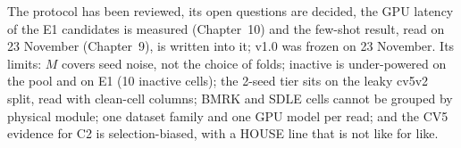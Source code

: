 The protocol has been reviewed, its open questions are decided, the GPU latency of the E1 candidates is measured (Chapter~10) and
the few-shot result, read on 23 November (Chapter~9), is written into it; v1.0 was frozen on 23 November. Its limits: $M$ covers seed noise, not the choice of folds;
inactive is under-powered on the pool and on E1 (10 inactive cells); the 2-seed tier sits on the leaky cv5v2 split, read with
clean-cell columns; BMRK and SDLE cells cannot be grouped by physical module; one dataset family and one GPU model per read; and the CV5
evidence for C2 is selection-biased, with a HOUSE line that is not like for like.
